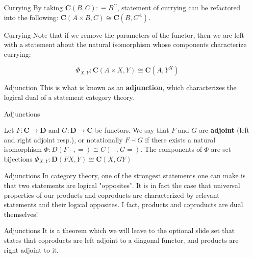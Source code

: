 \documentclass[tikz]{beamer}
\theoremstyle{definition}
\newcommand{\cat}[1]{\mathbf{#1}}
\begin{document}
\begin{frame}{Currying}
   By taking $\cat{C}(B, C) :\equiv B^C$, statement of currying can  be refactored into the following: $\cat{C}(A \times B, C) \cong \cat{C}(B, C^A)$.
\end{frame}

\begin{frame}{Currying}
   Note that if we remove the parameters of the functor, then we are left with a statement about the natural isomorphism whose components characterize currying:

   \begin{center}
    \begin{equation*}
		\Phi_{X,Y} : \cat{C}(A \times X, Y) \cong \cat{C}(A, Y^X)
	\end{equation*}
   \end{center}
\end{frame}

\begin{frame}{Adjunction}
   This is what is known as an \textbf{adjunction}, which characterizes the logical dual of a statement category theory.
\end{frame}

\begin{frame}{Adjunctions}
   \begin{definition}[Adjunction]
    Let $F: \cat{C} \to \cat{D}$ and $G: \cat{D} \to \cat{C}$ be functors. We say that $F$ and $G$ are \textbf{adjoint} (left and right adjoint resp.), or notationally $F \dashv G$ if there exists a natural isomorphism $\Phi : D(F-,=) \cong C(-, G=)$. The components of $\Phi$ are set bijections $\Phi_{X,Y} : \cat{D}(FX, Y) \cong \cat{C}(X, GY)$
   \end{definition}
\end{frame}

\begin{frame}{Adjunctions}
   In category theory, one of the strongest statements one can make is that two statements are logical "opposites". It is in fact the case that universal properties of our products and coproducts are characterized by relevant statements and their logical opposites. I fact, products and coproducts are dual themselves!
\end{frame}

\begin{frame}{Adjunctions}
   It is a theorem which we will leave to the optional slide set that states that coproducts are left adjoint to a diagonal functor, and products are right adjoint to it.
\end{frame}
\end{document}
